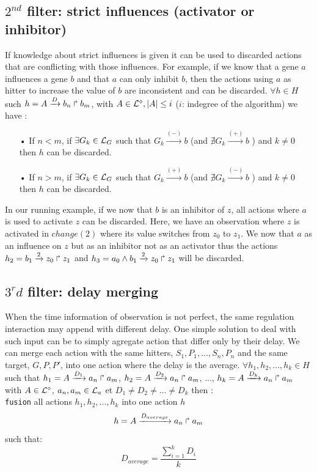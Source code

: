 \subsection{$2^{nd}$ filter: strict influences (activator or inhibitor)}

If knowledge about strict influences is given it can be used to discarded actions that are conflicting with those influences.
For example, if we know that a gene $a$ influences a gene $b$ and that $a$ can only inhibit $b$, then the actions using $a$ as hitter to increase the value of $b$ are inconsistent and can be discarded.
$\forall h \in H$ such $h=A\xrightarrow{D} b_n \Rsh b_m$, with $ A \in \mathcal{L}^{\diamond}, | A| \leq i$ ($i$: indegree of the algorithm) we have :

\begin{itemize}
\item[•] If $n < m$, if $\exists G_k \in \mathcal{L}_G $ such that $G_k \xrightarrow{(-)} b$ (and $\nexists G_k \xrightarrow{(+)} b$ ) and $k \neq 0$ then $h$ can be discarded.
\item[•] If $n > m$, if $\exists G_k \in \mathcal{L}_G $ such that $G_k \xrightarrow{(+)} b$ (and $\nexists G_k \xrightarrow{(-)} b$ ) and $k \neq 0$ then $h$ can be discarded.
\end{itemize} 

In our running example, if we now that $b$ is an inhibitor of $z$, all actions where $a$ is used to activate $z$ can be discarded.
Here, we have an observation where $z$ is activated in $change(2)$ where its value switches from $z_0$ to $z_1$.
We now that $a$ as an influence on $z$ but as an inhibitor not as an activator thus the actions $h_2=b_1\xrightarrow{2} z_0 \Rsh z_1$ and $h_3=a_0 \wedge b_1 \xrightarrow{2} z_0 \Rsh z_1$ will be discarded.

\subsection{$3^rd$ filter: delay merging}

When the time information of observation is not perfect, the same regulation interaction may append with different delay.
One simple solution to deal with such input can be to simply agregate action that differ only by their delay.
We can merge each action with the same hitters, $S_1,P_1,\ldots, S_n,P_n$ and the same target, $G, P, P'$, into one action where the delay is the average.
$\forall h_1, h_2,..., h_k \in H$ such that $h_1=A\xrightarrow{D_1} a_n \Rsh a_m$, $h_2=A\xrightarrow{D_2} a_n \Rsh a_m$, ..., $h_k=A\xrightarrow{D_k} a_n \Rsh a_m$ with $ A \in \mathcal{L}^{\diamond}$, $a_n, a_m \in \mathcal{L}_a$ et $D_1 \neq D_2 \neq ... \neq D_k$ then : \\
\texttt{fusion} all actions $h_1, h_2,..., h_k$ into one action $h$ $$h=A\xrightarrow{D_{average}} a_n \Rsh a_m$$ such that: 
$$D_{average} = \frac{\sum_{i=1}^k D_{i}}{k} $$

